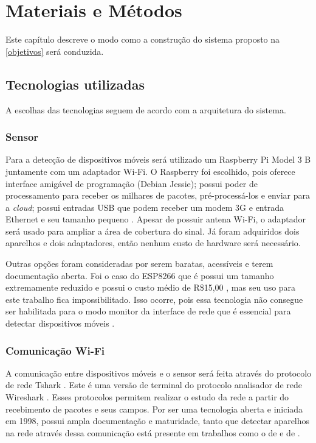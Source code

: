 
\chapter{Materiais e Métodos}
\label{metodologia}
Este capítulo descreve o modo como a construção do sistema proposto na \autoref{objetivos} será conduzida.

\section{Tecnologias utilizadas}
A escolhas das tecnologias seguem de acordo com a arquitetura do sistema.

\subsection{Sensor}
Para a detecção de dispositivos móveis será utilizado um Raspberry Pi Model 3 B juntamente com um adaptador Wi-Fi. O Raspberry foi escolhido,
pois oferece interface amigável de programação (Debian Jessie); possui poder de processamento para receber os milhares de pacotes, pré-processá-los
e enviar para a \emph{cloud}; possui entradas USB que podem receber um modem 3G e entrada Ethernet e seu tamanho pequeno \cite{rpi2017}. Apesar de possuir
antena Wi-Fi, o adaptador será usado para ampliar a área de cobertura do sinal. Já foram adquiridos dois aparelhos e dois adaptadores, então
nenhum custo de hardware será necessário.

Outras opções foram consideradas por serem baratas, acessíveis e terem documentação aberta. Foi o caso do ESP8266 que é possui um tamanho extremamente
reduzido e possui o custo médio de R\$15,00 \cite{Embarcados2015}, mas seu uso para este trabalho fica impossibilitado. Isso
ocorre, pois essa tecnologia não consegue ser habilitada para o modo monitor da interface de rede que é essencial para detectar dispositivos móveis
\cite{Puhl2016} \cite{Ferreira2016}.

\subsection{Comunicação Wi-Fi}
A comunicação entre dispositivos móveis e o sensor será feita através do protocolo de rede Tshark \cite{Wireshark2017}. Este é uma versão de terminal do protocolo
analisador de rede Wireshark \cite{Wireshark2017a}. Esses protocolos permitem realizar o estudo da rede a partir do recebimento de pacotes e seus campos. Por
ser uma tecnologia aberta e iniciada em 1998, possui ampla documentação e maturidade, tanto que detectar aparelhos na rede através dessa comunicação
está presente em trabalhos como o de  e de .

